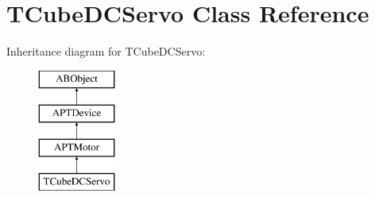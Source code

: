 \hypertarget{class_t_cube_d_c_servo}{}\section{T\+Cube\+D\+C\+Servo Class Reference}
\label{class_t_cube_d_c_servo}
Inheritance diagram for T\+Cube\+D\+C\+Servo\+:\begin{figure}[H]
\begin{center}
\leavevmode
\includegraphics[height=4.000000cm]{class_t_cube_d_c_servo}
\end{center}
\end{figure}
